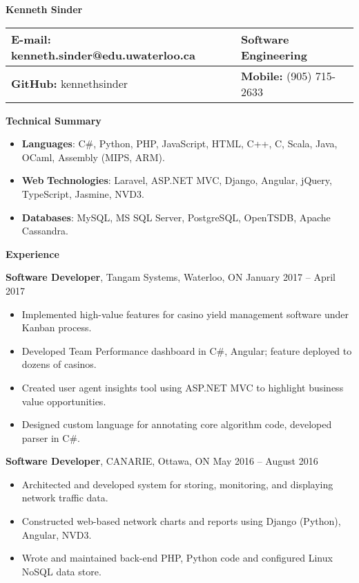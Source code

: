\documentclass[]{article}
\date{}
\begin{document}
\textbf{Kenneth Sinder}

\begin{longtable}[]{@{}ll@{}}
\toprule
\textbf{E-mail}: kenneth.sinder@edu.uwaterloo.ca & \textbf{Software
Engineering}\tabularnewline
\midrule
\endhead
\textbf{GitHub:} kennethsinder & \textbf{Mobile:} (905)
715-2633\tabularnewline
\bottomrule
\end{longtable}

\textbf{Technical Summary}

\begin{itemize}
\item
  \textbf{Languages}: C\#, Python, PHP, JavaScript, HTML, C++, C, Scala,
  Java, OCaml, Assembly (MIPS, ARM).
\item
  \textbf{Web} \textbf{Technologies}: Laravel, ASP.NET MVC, Django,
  Angular, jQuery, TypeScript, Jasmine, NVD3.
\item
  \textbf{Databases}: MySQL, MS SQL Server, PostgreSQL, OpenTSDB, Apache
  Cassandra.
\end{itemize}

\textbf{Experience}

\textbf{Software Developer}, Tangam Systems, Waterloo, ON January 2017
-- April 2017

\begin{itemize}
\item
  Implemented high-value features for casino yield management software
  under Kanban process.
\end{itemize}

\begin{itemize}
\item
  Developed Team Performance dashboard in C\#, Angular; feature deployed
  to dozens of casinos.
\item
  Created user agent insights tool using ASP.NET MVC to highlight
  business value opportunities.
\item
  Designed custom language for annotating core algorithm code, developed
  parser in C\#.
\end{itemize}

\textbf{Software Developer}, CANARIE, Ottawa, ON May 2016 -- August 2016

\begin{itemize}
\item
  Architected and developed system for storing, monitoring, and
  displaying network traffic data.
\item
  Constructed web-based network charts and reports using Django
  (Python), Angular, NVD3.
\item
  Wrote and maintained back-end PHP, Python code and configured Linux
  NoSQL data store.
\end{itemize}
\end{document}
